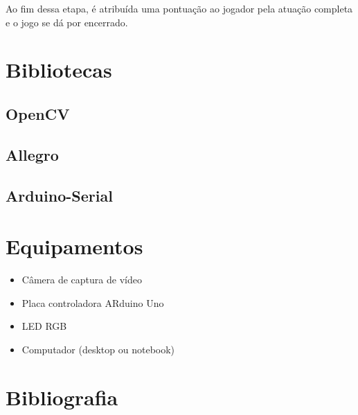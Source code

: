 \documentclass[12pt]{article}
\begin{document}
 Ao fim dessa etapa, \'e atribuída uma pontua\c c\~ao ao jogador pela atua\c c\~ao completa e o jogo se d\'a por encerrado.

\section{Bibliotecas}
\subsection{OpenCV}
\subsection{Allegro}
\subsection{Arduino-Serial \cite{arduino:serial}}

\section{Equipamentos}
\begin{itemize}
\item C\^amera de captura de v\'ideo
\item Placa controladora ARduino Uno
\item LED RGB
\item Computador (desktop ou notebook)
\end{itemize}

\section{Bibliografia}

%

\end{document}
